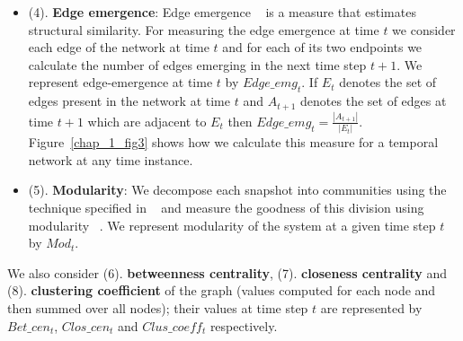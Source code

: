 \begin{itemize}
\begin{figure}[h]
\begin{center}
%   
  
 
 \end{center}
 \end{figure}

   
\item (4). {\bf  Edge emergence}: Edge emergence ~\cite{sur2014attack} is a measure that estimates structural similarity. For measuring the 
  edge emergence at time $t$ we consider each edge of the network at time $t$ and for each of its two endpoints we calculate the number of edges 
  emerging in the next time step $t+1$. We represent edge-emergence at time $t$ by $Edge\_emg_{t}$. If $E_t$ denotes the set of edges present in the network at time $t$ 
  and $A_{t+1}$ denotes the set of edges at time $t+1$ which are adjacent to $E_t$ then $Edge\_emg_{t}=\frac{|A_{t+1}|}{|E_{t}|}$. 
Figure~\ref{chap_1_fig3} shows how we calculate this measure for a temporal network at any time instance.
  
  
  \item (5). {\bf  Modularity}: We decompose each snapshot into communities using the technique specified in ~\cite{blondel2008fast}
  and measure the goodness of this division using modularity ~\cite{newman2006modularity}. We represent modularity 
  of the system at a given time step {$t$} by {$Mod_{t}$}. 
  
  
 \end{itemize}
 We also consider (6). {\bf  betweenness centrality}, (7). {\bf closeness centrality} and (8). {\bf  clustering coefficient} of the graph (values computed for each node and then summed over all nodes); their values at time step $t$ are represented by 
  {$Bet\_cen_{t}$}, {$Clos\_cen_{t}$} and {$Clus\_coeff_{t}$} respectively.

\medskip
